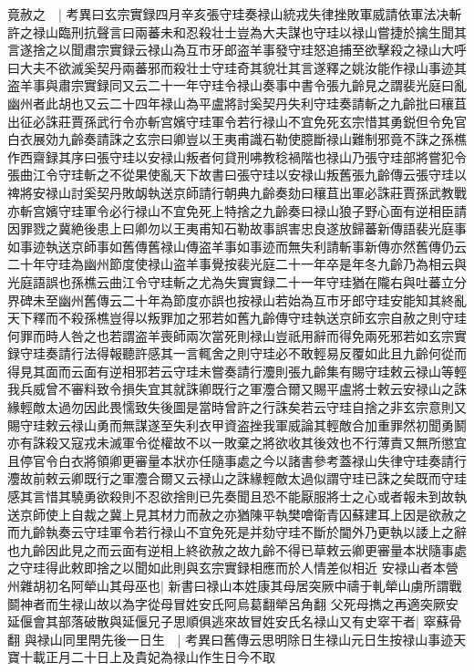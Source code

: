 竟赦之　|{
	考異曰玄宗實録四月辛亥張守珪奏禄山統戎失律挫敗軍威請依軍法决斬許之禄山臨刑抗聲言曰兩蕃未和忍殺壮士豈為大夫謀也守珪以禄山嘗捷於擒生聞其言遂捨之以聞肅宗實録云禄山為互市牙郎盗羊事發守珪怒追捕至欲擊殺之禄山大呼曰大夫不欲滅奚契丹兩蕃邪而殺壮士守珪奇其貌壮其言遂釋之姚汝能作禄山事迹其盗羊事與肅宗實録同又云二十一年守珪令禄山奏事中書令張九齡見之謂裴光庭曰亂幽州者此胡也又云二十四年禄山為平盧將討奚契丹失利守珪奏請斬之九齡批曰穰苴出征必誅莊賈孫武行令亦斬宫嬪守珪軍令若行禄山不宜免死玄宗惜其勇鋭但令免官白衣展効九齡奏請誅之玄宗曰卿豈以王夷甫識石勒使臆斷禄山難制邪竟不誅之孫樵作西齋録其序曰張守珪以安禄山叛者何貸刑咈教稔禍階也禄山乃張守珪部將嘗犯令張曲江令守珪斬之不從果使亂天下故書曰張守珪以安禄山叛舊張九齡傳云張守珪以禆將安禄山討奚契丹敗衂執送京師請行朝典九齡奏劾曰穰苴出軍必誅莊賈孫武教戰亦斬宫嬪守珪軍令必行禄山不宜免死上特捨之九齡奏曰禄山狼子野心面有逆相臣請因罪戮之冀絶後患上曰卿勿以王夷甫知石勒故事誤害忠良遂放歸蕃新傳語裴光庭事如事迹執送京師事如舊傳舊禄山傳盗羊事如事迹而無失利請斬事新傳亦然舊傳仍云二十年守珪為幽州節度使禄山盗羊事覺按裴光庭二十一年卒是年冬九齡乃為相云與光庭語誤也孫樵云曲江令守珪斬之尤為失實實録二十一年守珪猶在隴右與吐蕃立分界碑未至幽州舊傳云二十年為節度亦誤也按禄山若始為互市牙郎守珪安能知其終亂天下釋而不殺孫樵豈得以叛罪加之邪若如舊九齡傳守珪執送京師玄宗自赦之則守珪何罪而時人咎之也若謂盗羊喪師兩次當死則禄山豈祇用辭而得免兩死邪若如玄宗實録守珪奏請行法得報聽許感其一言輒舍之則守珪必不敢輕易反覆如此且九齡何從而得見其面而云面有逆相邪若云守珪未嘗奏請行灋則張九齡集有賜守珪敕云禄山等輕我兵威曾不審料致令損失宜其就誅卿既行之軍灋合爾又賜平盧將士敕云安禄山之誅緣輕敵太過勿因此畏懦致失後圖是當時曾許之行誅矣若云守珪自捨之非玄宗意則又賜守珪敕云禄山勇而無謀遂至失利衣甲資盗挫我軍威論其輕敵合加重罪然初聞勇鬭亦有誅殺又寇戎未滅軍令從權故不以一敗棄之將欲收其後效也不行薄責又無所懲宜且停官令白衣將領卿更審量本狀亦任隨事處之今以諸書參考蓋禄山失律守珪奏請行灋故前敕云卿既行之軍灋合爾又云禄山之誅緣輕敵太過似謂守珪已誅之矣既而守珪感其言惜其驍勇欲殺則不忍欲捨則已先奏聞且恐不能厭服將士之心或者報未到故執送京師使上自裁之冀上見其材力而赦之亦猶陳平執樊噲衛青囚蘇建耳上因是欲赦之而九齡執奏云守珪軍令若行禄山不宜免死是并劾守珪不斷於閫外乃更執以諉上之辭也九齡因此見之而云面有逆相上終欲赦之故九齡不得已草敕云卿更審量本狀隨事處之守珪得此敕即捨之以聞如此則與玄宗實録相應而於人情差似相近}
安禄山者本營州雜胡初名阿犖山其母巫也|{
	新書曰禄山本姓康其母居突厥中禱于軋犖山虜所謂戰鬬神者而生禄山故以為字從母冒姓安氏阿烏葛翻犖呂角翻}
父死母擕之再適突厥安延偃會其部落破散與延偃兄子思順俱逃來故冒姓安氏名禄山又有史窣干者|{
	窣蘇骨翻}
與禄山同里閈先後一日生　|{
	考異曰舊傳云思明除日生禄山元日生按禄山事迹天寶十載正月二十日上及貴妃為禄山作生日今不取}
